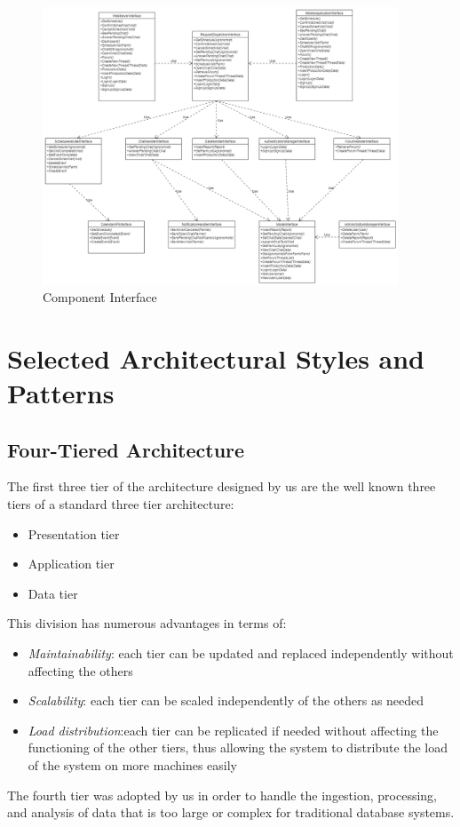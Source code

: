 \documentclass[10pt]{report}
\begin{document}
\begin{figure}[H]
    \centering
    \includegraphics[width=400px]{Interface/int_diagram2.png}
    \caption{Component Interface}
\end{figure}

\section{Selected Architectural Styles and Patterns}
\subsection{Four-Tiered Architecture}
The first three tier of the architecture designed by us are the well known three tiers of a standard three tier architecture:
\begin{itemize}
    \item Presentation tier
    \item Application tier
    \item Data tier
\end{itemize}
This division has numerous advantages in terms of:
\begin{itemize}
    \item \emph{Maintainability}: each tier can be updated and replaced independently without affecting the others
    \item \emph{Scalability}: each tier can be scaled independently of the others as needed
    \item \emph{Load distribution}:each tier can be replicated if needed without affecting the functioning of the other tiers, thus allowing the system to distribute the load of the system on more machines easily
\end{itemize}
The fourth tier was adopted by us in order to handle the ingestion, processing, and analysis of data that is too large or complex for traditional database systems.
\end{document}

